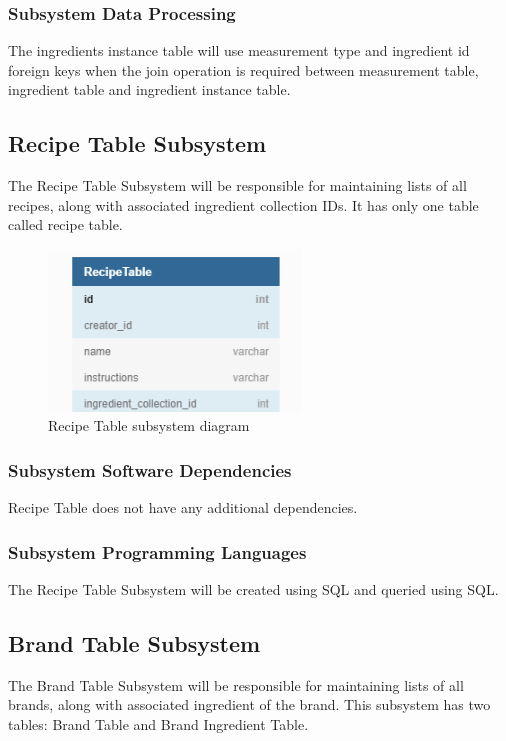 \subsubsection{Subsystem Data Processing}
The ingredients instance table will use measurement type and ingredient id foreign keys when the join operation is required between measurement table, ingredient table and ingredient instance table.

\subsection{Recipe Table Subsystem}
The Recipe Table Subsystem will be responsible for maintaining lists of all recipes, along with associated ingredient collection IDs. It has only one table called recipe table.

\begin{figure}[h!]
	\centering
 	\includegraphics[width=0.60\textwidth]{images/Recepice_Subsystem.png}
 \caption{Recipe Table subsystem diagram}
\end{figure}

\subsubsection{Subsystem Software Dependencies}
Recipe Table does not have any additional dependencies.

\subsubsection{Subsystem Programming Languages}
The Recipe Table Subsystem will be created using SQL and queried using SQL.

\subsection{Brand Table Subsystem}
The Brand Table Subsystem will be responsible for maintaining lists of all brands, along with associated ingredient of the brand. This subsystem has two tables: Brand Table and Brand Ingredient Table.

